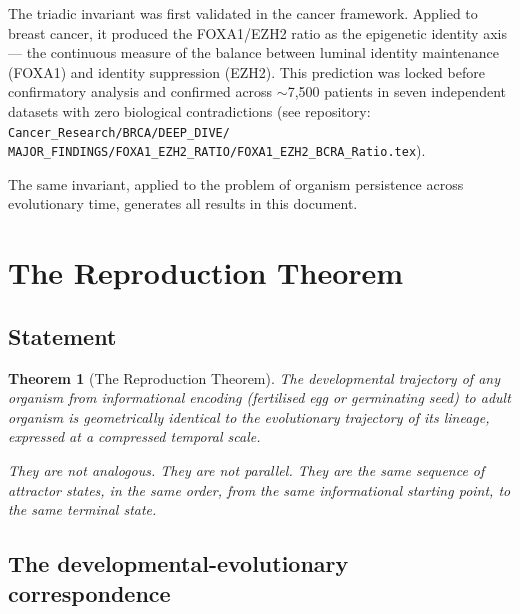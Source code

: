 \documentclass[12pt, a4paper]{article}
\newtheorem{theorem}{Theorem}[section]
\theoremstyle{definition}
\theoremstyle{remark}
\begin{document}
The triadic invariant was first validated in the cancer
framework. Applied to breast cancer, it produced the
FOXA1/EZH2 ratio as the epigenetic identity axis --- the
continuous measure of the balance between luminal identity
maintenance (FOXA1) and identity suppression (EZH2). This
prediction was locked before confirmatory analysis and
confirmed across $\sim$7,500 patients in seven independent
datasets with zero biological contradictions
(see repository: \texttt{Cancer\_Research/BRCA/DEEP\_DIVE/\\
MAJOR\_FINDINGS/FOXA1\_EZH2\_RATIO/FOXA1\_EZH2\_BCRA\_Ratio.tex}).

The same invariant, applied to the problem of organism
persistence across evolutionary time, generates all results
in this document.

\section{The Reproduction Theorem}

\subsection{Statement}

\begin{theorem}[The Reproduction Theorem]
The developmental trajectory of any organism from
informational encoding (fertilised egg or germinating seed)
to adult organism is geometrically identical to the
evolutionary trajectory of its lineage, expressed at a
compressed temporal scale.

They are not analogous. They are not parallel. They are the
same sequence of attractor states, in the same order, from
the same informational starting point, to the same terminal
state.
\end{theorem}

\subsection{The developmental-evolutionary correspondence}
\end{document}
